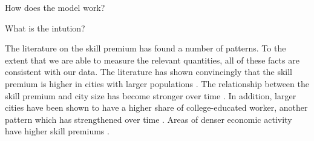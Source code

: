 \documentclass{article}
\begin{document}


How does the model work?

What is the intution?

The literature on the skill premium has found a number of patterns.  To the extent that we are able to measure the relevant quantities, all of these facts are consistent with our data.  The literature has shown convincingly that the skill premium is higher in cities with larger populations 
\citep{davis2012spatial}.  The relationship between the skill premium and city size has become stronger over time \citep{baum2013inequality, lindley2014spatial}.  In addition, larger cities have been shown to have a higher share of college-educated worker, another pattern which has strengthened over time \citep{moretti2008real, lindley2014spatial}.  Areas of denser economic activity have higher skill premiums \citep{combes2012sorting}.
\end{document}
